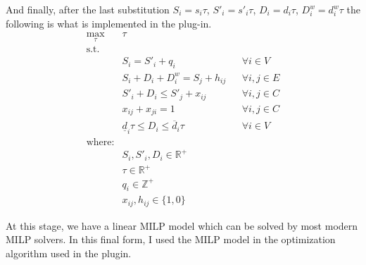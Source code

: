 And finally, after the last substitution $ S_i = s_i \tau $, $ S'_i = s'_i \tau $, $ D_i = d_i \tau $, $D^w_i = d^w_i \tau$ the following is what is implemented in the plug-in. \\

\begin{align}
    \displaystyle \max_\tau\text{ } & \tau  \\
    \textrm{s.t. } \\
        & S_i = S'_i + q_i & & \forall i \in V \\
        & S_i + D_i + D^w_i = S_j + h_{ij} & & \forall i, j \in E \\
        & S'_i + D_i \leq S'_j + x_{ij} & & \forall i, j \in C \\
        & x_{ij} + x_{ji} = 1 & & \forall i, j \in C \\
        & \underline{d}_i \tau \leq D_i \leq \overline{d}_i \tau & & \forall i \in V \\
    \text{where:} \\
        & S_i, S'_i, D_i \in \mathbb{R}^+\\
        & \tau \in \mathbb{R}^+ \\
        & q_i \in \mathbb{Z}^+\\
        & x_{ij}, h_{ij} \in \{1, 0\} 
\end{align}

At this stage, we have a linear MILP model which can be solved by most modern MILP solvers. In this final form, I used the MILP model in the optimization algorithm used in the plugin.\\